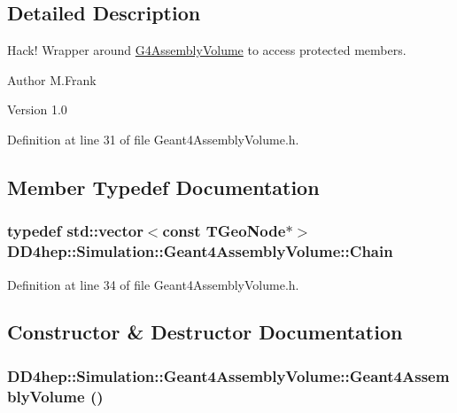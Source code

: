\subsection{Detailed Description}
Hack! Wrapper around \hyperlink{class_g4_assembly_volume}{G4AssemblyVolume} to access protected members. \begin{DoxyAuthor}{Author}
M.Frank 
\end{DoxyAuthor}
\begin{DoxyVersion}{Version}
1.0 
\end{DoxyVersion}


Definition at line 31 of file Geant4AssemblyVolume.h.

\subsection{Member Typedef Documentation}
\hypertarget{class_d_d4hep_1_1_simulation_1_1_geant4_assembly_volume_ad79481b292635c219fcc03d160689211}{
\subsubsection[{Chain}]{\setlength{\rightskip}{0pt plus 5cm}typedef std::vector$<$const TGeoNode$\ast$$>$ {\bf DD4hep::Simulation::Geant4AssemblyVolume::Chain}}}
\label{class_d_d4hep_1_1_simulation_1_1_geant4_assembly_volume_ad79481b292635c219fcc03d160689211}


Definition at line 34 of file Geant4AssemblyVolume.h.

\subsection{Constructor \& Destructor Documentation}
\hypertarget{class_d_d4hep_1_1_simulation_1_1_geant4_assembly_volume_a140dd17a22b41606681a2494737ed02a}{
\subsubsection[{Geant4AssemblyVolume}]{\setlength{\rightskip}{0pt plus 5cm}DD4hep::Simulation::Geant4AssemblyVolume::Geant4AssemblyVolume ()}}
\label{class_d_d4hep_1_1_simulation_1_1_geant4_assembly_volume_a140dd17a22b41606681a2494737ed02a}


